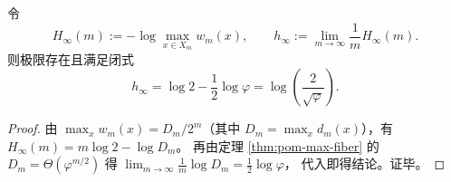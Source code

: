 \begin{corollary}\label{cor:pom-min-entropy-rate}
令
\[
H_\infty(m):=-\log\max_{x\in X_m}w_m(x),
\qquad
h_\infty:=\lim_{m\to\infty}\frac{1}{m}H_\infty(m).
\]
则极限存在且满足闭式
\[
\boxed{\;
h_\infty=\log 2-\frac{1}{2}\log\varphi=\log\!\left(\frac{2}{\sqrt{\varphi}}\right).\;}
\]
\end{corollary}
\begin{proof}
由 \(\max_x w_m(x)=D_m/2^m\)（其中 \(D_m=\max_x d_m(x)\)），有
\(
H_\infty(m)=m\log 2-\log D_m
\)。
再由定理 \ref{thm:pom-max-fiber} 的 \(D_m=\Theta(\varphi^{m/2})\) 得
\(
\lim_{m\to\infty}\frac{1}{m}\log D_m=\frac{1}{2}\log\varphi
\)，
代入即得结论。证毕。
\end{proof}

